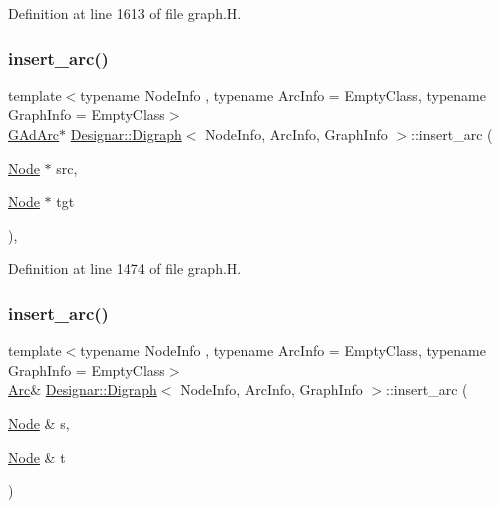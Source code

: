 Definition at line 1613 of file graph.\+H.

\mbox{\label{class_designar_1_1_digraph_a9180c479d24dc8dc648a37451c90d066}} 
\subsubsection{\texorpdfstring{insert\+\_\+arc()}{insert\_arc()}\hspace{0.1cm}{\footnotesize\ttfamily [1/4]}}
{\footnotesize\ttfamily template$<$typename Node\+Info , typename Arc\+Info  = Empty\+Class, typename Graph\+Info  = Empty\+Class$>$ \\
\hyperlink{class_designar_1_1_digraph_a0c6d846f23d1e82556fb6055557df53f}{G\+Ad\+Arc}$\ast$ \hyperlink{class_designar_1_1_digraph}{Designar\+::\+Digraph}$<$ Node\+Info, Arc\+Info, Graph\+Info $>$\+::insert\+\_\+arc (\begin{DoxyParamCaption}\item[{\hyperlink{class_designar_1_1_digraph_a4dc921c41a480b7946a04170e997d8ae}{Node} $\ast$}]{src,  }\item[{\hyperlink{class_designar_1_1_digraph_a4dc921c41a480b7946a04170e997d8ae}{Node} $\ast$}]{tgt }\end{DoxyParamCaption})\hspace{0.3cm}{\ttfamily [inline]}, {\ttfamily [protected]}}



Definition at line 1474 of file graph.\+H.

\mbox{\label{class_designar_1_1_digraph_a52b127c0102e207125c6f4eaaeb7ab26}} 
\subsubsection{\texorpdfstring{insert\+\_\+arc()}{insert\_arc()}\hspace{0.1cm}{\footnotesize\ttfamily [2/4]}}
{\footnotesize\ttfamily template$<$typename Node\+Info , typename Arc\+Info  = Empty\+Class, typename Graph\+Info  = Empty\+Class$>$ \\
\hyperlink{class_designar_1_1_digraph_a0ceb278671f2a535c00fddccdeafd69f}{Arc}\& \hyperlink{class_designar_1_1_digraph}{Designar\+::\+Digraph}$<$ Node\+Info, Arc\+Info, Graph\+Info $>$\+::insert\+\_\+arc (\begin{DoxyParamCaption}\item[{\hyperlink{class_designar_1_1_digraph_a4dc921c41a480b7946a04170e997d8ae}{Node} \&}]{s,  }\item[{\hyperlink{class_designar_1_1_digraph_a4dc921c41a480b7946a04170e997d8ae}{Node} \&}]{t }\end{DoxyParamCaption})\hspace{0.3cm}{\ttfamily [inline]}}



